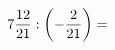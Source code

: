 \documentclass[preview]{standalone}
\begin{document}
\begin{align*}
7 { 12 \over 21 }  :  \left( - { 2 \over 21 } \right)  =
\end{align*}
\end{document}
